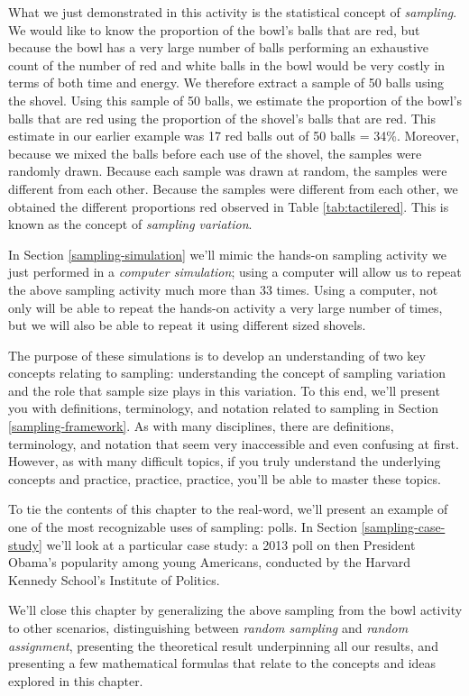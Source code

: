 \documentclass[12pt, krantz2,]{krantz}
\begin{document}
What we just demonstrated in this activity is the statistical concept of \emph{sampling}. We would like to know the proportion of the bowl's balls that are red, but because the bowl has a very large number of balls performing an exhaustive count of the number of red and white balls in the bowl would be very costly in terms of both time and energy. We therefore extract a sample of 50 balls using the shovel. Using this sample of 50 balls, we estimate the proportion of the bowl's balls that are red using the proportion of the shovel's balls that are red. This estimate in our earlier example was 17 red balls out of 50 balls = 34\%. Moreover, because we mixed the balls before each use of the shovel, the samples were randomly drawn. Because each sample was drawn at random, the samples were different from each other. Because the samples were different from each other, we obtained the different proportions red observed in Table \ref{tab:tactilered}. This is known as the concept of \emph{sampling variation}.

In Section \ref{sampling-simulation} we'll mimic the hands-on sampling activity we just performed in a \emph{computer simulation}; using a computer will allow us to repeat the above sampling activity much more than 33 times. Using a computer, not only will be able to repeat the hands-on activity a very large number of times, but we will also be able to repeat it using different sized shovels.

The purpose of these simulations is to develop an understanding of two key concepts relating to sampling: understanding the concept of sampling variation and the role that sample size plays in this variation. To this end, we'll present you with definitions, terminology, and notation related to sampling in Section \ref{sampling-framework}. As with many disciplines, there are definitions, terminology, and notation that seem very inaccessible and even confusing at first. However, as with many difficult topics, if you truly understand the underlying concepts and practice, practice, practice, you'll be able to master these topics.

To tie the contents of this chapter to the real-word, we'll present an example of one of the most recognizable uses of sampling: polls. In Section \ref{sampling-case-study} we'll look at a particular case study: a 2013 poll on then President Obama's popularity among young Americans, conducted by the Harvard Kennedy School's Institute of Politics.

We'll close this chapter by generalizing the above sampling from the bowl activity to other scenarios, distinguishing between \emph{random sampling} and \emph{random assignment}, presenting the theoretical result underpinning all our results, and presenting a few mathematical formulas that relate to the concepts and ideas explored in this chapter.
\end{document}
